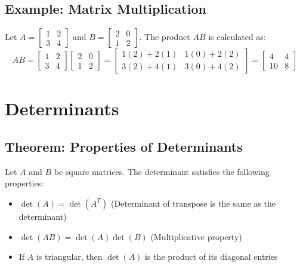 \subsection{Example: Matrix Multiplication}
\begin{example}
Let $A = \begin{bmatrix} 1 & 2 \\ 3 & 4 \end{bmatrix}$ and $B = \begin{bmatrix} 2 & 0 \\ 1 & 2 \end{bmatrix}$. The product $AB$ is calculated as:
\[
AB = \begin{bmatrix} 1 & 2 \\ 3 & 4 \end{bmatrix} \begin{bmatrix} 2 & 0 \\ 1 & 2 \end{bmatrix} = \begin{bmatrix} 1(2) + 2(1) & 1(0) + 2(2) \\ 3(2) + 4(1) & 3(0) + 4(2) \end{bmatrix} = \begin{bmatrix} 4 & 4 \\ 10 & 8 \end{bmatrix}
\]
\end{example}

\newpage
\section{Determinants}

\subsection{Theorem: Properties of Determinants}
\begin{theorem}
Let $A$ and $B$ be square matrices. The determinant satisfies the following properties:
\begin{itemize}
    \item $\det(A) = \det(A^T)$ (Determinant of transpose is the same as the determinant)
    \item $\det(AB) = \det(A)\det(B)$ (Multiplicative property)
    \item If $A$ is triangular, then $\det(A)$ is the product of its diagonal entries
\end{itemize}
\end{theorem}

